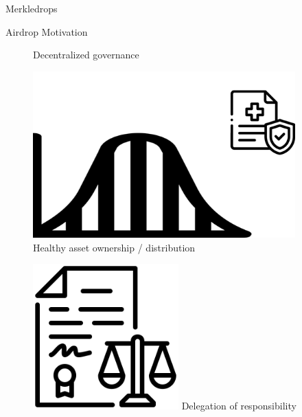 \documentclass[handout]{beamer}
\begin{document}
\begin{frame}{Merkledrops}

\end{frame}



\begin{frame}{Airdrop Motivation}

\vspace{20pt}%


  \begin{figure}[H]
  \hspace{-15pt}
  \begin{minipage}[t]{.35\textwidth}
  	\center 
	\scalebox{0.8}{
		\begin{tikzpicture}
  			
		\end{tikzpicture}
	}
    Decentralized governance
  \end{minipage}
  \hspace{16pt}
  \begin{minipage}[t]{.25\textwidth}\vspace{-88pt}%
  \center
    \includegraphics[width=0.9\textwidth]{../assets/images/healthy_distribution.png}
	\vspace{0.8em}\vspace{3.2em}    
    Healthy asset ownership / distribution
  \end{minipage}
  \hfill
  \begin{minipage}[t]{.25\textwidth}\vspace{-77pt}%
  \center 
    \includegraphics[width=0.5\textwidth]{../assets/images/legislation.png}
    \vspace{0.8em}\vspace{2.7em}
    Delegation of responsibility
  \end{minipage}  
\end{figure}
\end{frame}
\end{document}
